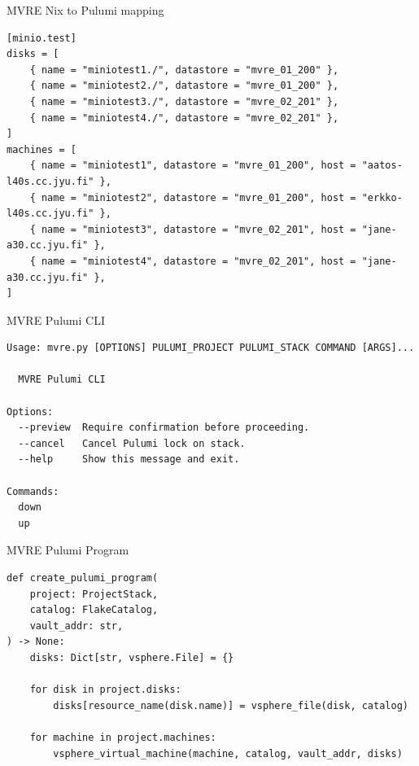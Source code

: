 \documentclass[12pt,aspectratio=169]{beamer}
\begin{document}
\begin{frame}[fragile]{MVRE Nix to Pulumi mapping}
\footnotesize
\begin{verbatim}
[minio.test]
disks = [
    { name = "miniotest1./", datastore = "mvre_01_200" },
    { name = "miniotest2./", datastore = "mvre_01_200" },
    { name = "miniotest3./", datastore = "mvre_02_201" },
    { name = "miniotest4./", datastore = "mvre_02_201" },
]
machines = [
    { name = "miniotest1", datastore = "mvre_01_200", host = "aatos-l40s.cc.jyu.fi" },
    { name = "miniotest2", datastore = "mvre_01_200", host = "erkko-l40s.cc.jyu.fi" },
    { name = "miniotest3", datastore = "mvre_02_201", host = "jane-a30.cc.jyu.fi" },
    { name = "miniotest4", datastore = "mvre_02_201", host = "jane-a30.cc.jyu.fi" },
]
\end{verbatim}
\end{frame}

\begin{frame}[fragile]{MVRE Pulumi CLI}
\footnotesize
\begin{verbatim}
Usage: mvre.py [OPTIONS] PULUMI_PROJECT PULUMI_STACK COMMAND [ARGS]...

  MVRE Pulumi CLI

Options:
  --preview  Require confirmation before proceeding.
  --cancel   Cancel Pulumi lock on stack.
  --help     Show this message and exit.

Commands:
  down
  up
\end{verbatim}
\end{frame}

\begin{frame}[fragile]{MVRE Pulumi Program}
\footnotesize
\begin{verbatim}
def create_pulumi_program(
    project: ProjectStack,
    catalog: FlakeCatalog,
    vault_addr: str,
) -> None:
    disks: Dict[str, vsphere.File] = {}

    for disk in project.disks:
        disks[resource_name(disk.name)] = vsphere_file(disk, catalog)

    for machine in project.machines:
        vsphere_virtual_machine(machine, catalog, vault_addr, disks)
\end{verbatim}
\end{frame}

\end{document}
